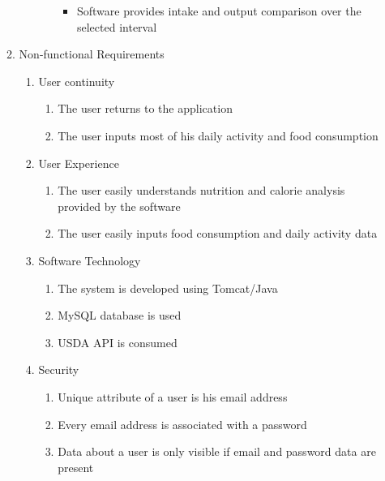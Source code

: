\begin{enumerate}
\begin{enumerate}
\begin{enumerate}
\begin{enumerate}
\begin{itemize}
			\item Software provides intake and output comparison over the selected interval
			\end{itemize}
		\end{enumerate}
		\end{enumerate}
\newpage
	\item Non-functional Requirements
		\begin{enumerate}
		\item User continuity
			\begin{enumerate}
			\item The user returns to the application
			\item The user inputs most of his daily activity and food consumption
			\end{enumerate}
		\item User Experience
			\begin{enumerate}
			\item The user easily understands nutrition and calorie analysis provided by the software
			\item The user easily inputs food consumption and daily activity data
			\end{enumerate}
		\item Software Technology
			\begin{enumerate}
			\item The system is developed using Tomcat/Java
			\item MySQL database is used
			\item USDA API is consumed
			\end{enumerate}
		\item Security
			\begin{enumerate}
			\item Unique attribute of a user is his email address
			\item Every email address is associated with a password
			\item Data about a user is only visible if email and password data are present
			\end{enumerate}
		\end{enumerate}
	\end{enumerate}
\end{enumerate}

